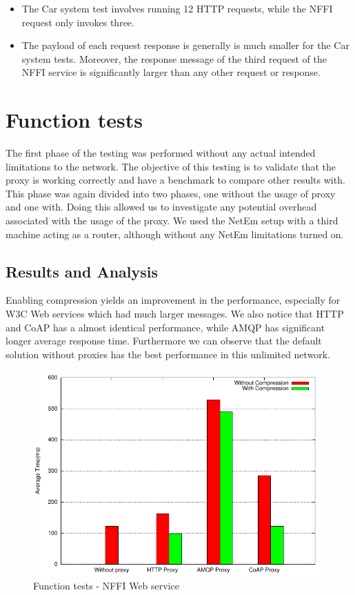 \begin{itemize}

     \item The Car system test involves running 12 HTTP requests, while the NFFI
     request only invokes three.

    \item The payload of each request response is generally is much smaller for
    the Car system tests. Moreover, the response message of the third request of the NFFI
    service is significantly larger than any other request or response.

\end{itemize}

\section{Function tests}

The first phase of the testing was performed without any actual intended
limitations to the network. The objective of this testing is to validate that
the proxy is working correctly and have a benchmark to compare other results
with. This phase was again divided into two phases, one without the usage of
proxy and one with. Doing this allowed us to investigate any potential
overhead associated with the usage of the proxy. We used the NetEm setup with
a third machine acting as a router, although without any NetEm limitations
turned on.


\subsection{Results and Analysis}

Enabling compression yields an improvement in the performance, especially for
W3C Web services which had much larger messages. We also notice that HTTP and
CoAP has a almost identical performance, while AMQP has significant longer
average response time. Furthermore we can observe that the default solution
without proxies has the best performance in this unlimited network.

\begin{figure}[H]
\center
\includegraphics[scale=0.75]{../results/function_tests/nffi/result.pdf}
\caption{Function tests - NFFI Web service}
\end{figure}

